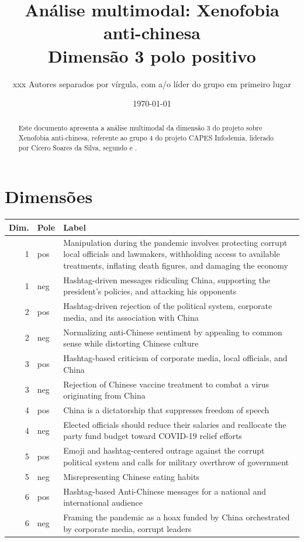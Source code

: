 \documentclass[aspectratio=169]{article}
\title{Análise multimodal: Xenofobia anti-chinesa\\Dimensão 3 polo positivo}
\author{xxx Autores separados por vírgula, com a/o líder do grupo em primeiro lugar}
\date{\today}
\begin{document}
\maketitle

\begin{abstract}
Este documento apresenta a análise multimodal da dimensão 3 do projeto sobre Xenofobia anti-chinesa, referente ao grupo 4 do projeto CAPES Infodemia, liderado por Cícero Soares da Silva, segundo  e .
\end{abstract}

\section{Dimensões}

\begin{table}[H]
\begin{tabular}{r l  p{}} \hline
Dim.&Pole& Label \\ \hline
1&pos&Manipulation during the pandemic involves protecting corrupt local officials and lawmakers, withholding access to available treatments, inflating death figures, and damaging the economy \\
1&neg&Hashtag-driven messages ridiculing China, supporting the president's policies, and attacking his opponents \\ \hline
2&pos&Hashtag-driven rejection of the political system, corporate media, and its association with China \\
2&neg&Normalizing anti-Chinese sentiment by appealing to common sense while distorting Chinese culture \\  \hline
3&pos&Hashtag-based criticism of corporate media, local officials, and China \\
3&neg&Rejection of Chinese vaccine treatment to combat a virus originating from China \\  \hline
4&pos&China is a dictatorship that suppresses freedom of speech  \\
4&neg&Elected officials should reduce their salaries and reallocate the party fund budget toward COVID-19 relief efforts \\  \hline
5&pos&Emoji and hashtag-centered outrage against the corrupt political system and calls for military overthrow of government  \\
5&neg&Misrepresenting Chinese eating habits \\  \hline
6&pos&Hashtag-based Anti-Chinese messages for a national and international audience  \\
6&neg&Framing the pandemic as a hoax funded by China orchestrated by corporate media, corrupt leaders \\
\hline
\end{tabular}
\end{table}
\end{document}
